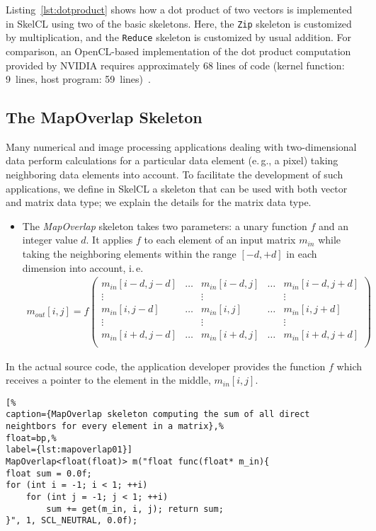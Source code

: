 Listing~\ref{lst:dotproduct} shows how a dot product of two vectors is implemented in SkelCL using two of the basic skeletons.
Here, the \texttt{Zip} skeleton is customized by multiplication, and the \texttt{Reduce} skeleton is customized by usual addition.  
For comparison, an OpenCL-based implementation of the dot product computation provided by NVIDIA requires approximately 68 lines of code (kernel function: 9~lines, host program: 59~lines)~\cite{CUDASDK-10}.

\subsection{The MapOverlap Skeleton}
\label{sec:skelcl:mapoverlap}
Many numerical and image processing applications dealing with two-dimensional data perform calculations for a particular data element (e.\,g., a pixel) taking neighboring data elements into account.
To facilitate the development of such applications, we define in SkelCL a skeleton that can be used with both vector and matrix data type; we explain the details for the matrix data type.
\begin{itemize}
  \item The \emph{MapOverlap} skeleton takes two parameters: a unary function $f$ and an integer value $d$.
   It applies $f$ to each element of an input matrix $m_{in}$ while taking the neighboring elements within the range $[-d, +d]$ in each dimension into account, i.\,e.
  \begin{align*}
m_{out}[i,j]=f\left(
\begin{array}{ccccc}
m_{in}[i-d,j-d] & \hdots & m_{in}[i-d,j] & \hdots & m_{in}[i-d,j+d] \\
\vdots & ~ & \vdots & ~ & \vdots \\
m_{in}[i,j-d] & \hdots & m_{in}[i,j] & \hdots & m_{in}[i,j+d]\\
\vdots & ~ & \vdots & ~ & \vdots \\
m_{in}[i+d,j-d] & \hdots & m_{in}[i+d,j] & \hdots & m_{in}[i+d,j+d] \\
\end{array}
\right)
\end{align*}
\end{itemize}

In the actual source code, the application developer provides the function $f$ which receives a pointer to the element in the middle, $m_{in}[i,j]$.

\begin{lstlisting}[%
caption={MapOverlap skeleton computing the sum of all direct neightbors for every element in a matrix},%
float=bp,%
label={lst:mapoverlap01}]
MapOverlap<float(float)> m("float func(float* m_in){
float sum = 0.0f;
for (int i = -1; i < 1; ++i)
	for (int j = -1; j < 1; ++i)
 		sum += get(m_in, i, j); return sum;
}", 1, SCL_NEUTRAL, 0.0f);
\end{lstlisting}



